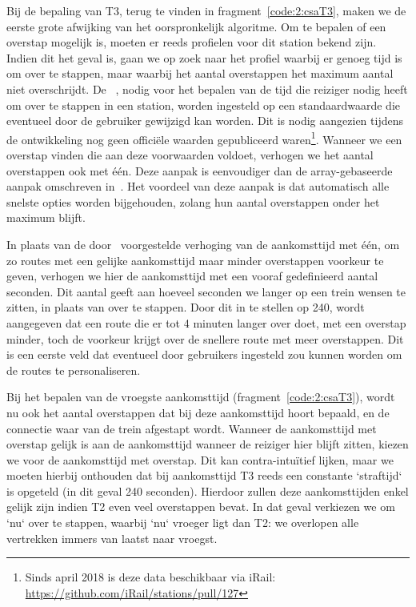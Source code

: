 Bij de bepaling van T3, terug te vinden in fragment~\ref{code:2:csaT3}, maken we de eerste grote afwijking van het oorspronkelijk algoritme. Om te bepalen of een overstap mogelijk is, moeten er reeds profielen voor dit station bekend zijn. Indien dit het geval is, gaan we op zoek naar het profiel waarbij er genoeg tijd is om over te stappen, maar waarbij het aantal overstappen het maximum aantal niet overschrijdt. 
De ~\citep{strasser17,hannemann08}, nodig voor het bepalen van de tijd die reiziger nodig heeft om over te stappen in een station, worden ingesteld op een standaardwaarde die eventueel door de gebruiker gewijzigd kan worden. Dit is nodig aangezien tijdens de ontwikkeling nog geen officiële waarden gepubliceerd waren\footnote{Sinds april 2018 is deze data beschikbaar via iRail: \url{https://github.com/iRail/stations/pull/127}}. 
Wanneer we een overstap vinden die aan deze voorwaarden voldoet, verhogen we het aantal overstappen ook met één. Deze aanpak is eenvoudiger dan de array-gebaseerde aanpak omschreven in~\cite{strasser17}. Het voordeel van deze aanpak is dat automatisch alle snelste opties worden bijgehouden, zolang hun aantal overstappen onder het maximum blijft. 

In plaats van de door~\cite{strasser17} voorgestelde verhoging van de aankomsttijd met één, om zo routes met een gelijke aankomsttijd maar minder overstappen voorkeur te geven, verhogen we hier de aankomsttijd met een vooraf gedefinieerd aantal seconden. Dit aantal geeft aan hoeveel seconden we langer op een trein wensen te zitten, in plaats van over te stappen. Door dit in te stellen op 240, wordt aangegeven dat een route die er tot 4 minuten langer over doet, met een overstap minder, toch de voorkeur krijgt over de snellere route met meer overstappen. Dit is een eerste veld dat eventueel door gebruikers ingesteld zou kunnen worden om de routes te personaliseren.

Bij het bepalen van de vroegste aankomsttijd (fragment~\ref{code:2:csaT3}), wordt nu ook het aantal overstappen dat bij deze aankomsttijd hoort bepaald, en de connectie waar van de trein afgestapt wordt. Wanneer de aankomsttijd met overstap gelijk is aan de aankomsttijd wanneer de reiziger hier blijft zitten, kiezen we voor de aankomsttijd met overstap. Dit kan contra-intuïtief lijken, maar we moeten hierbij onthouden dat bij aankomsttijd T3 reeds een constante `straftijd` is opgeteld (in dit geval 240 seconden). Hierdoor zullen deze aankomsttijden enkel gelijk zijn indien T2 even veel overstappen bevat. In dat geval verkiezen we om `nu` over te stappen, waarbij `nu` vroeger ligt dan T2: we overlopen alle vertrekken immers van laatst naar vroegst.

